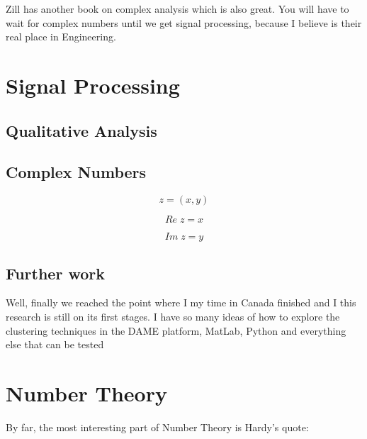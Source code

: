 \documentclass[11pt,fleqn]{book} %
\begin{document}
Zill has another book on complex analysis which is also great.  You will have to wait for complex numbers until we get signal processing, because I believe is their real place in Engineering. 




\chapter{Signal Processing}

\section{Qualitative Analysis}

\section{Complex Numbers}

\begin{equation}
z = (x, y)
\label{eq:c1}
\end{equation}


\begin{equation}
Re \; z = x
\label{eq:c1}
\end{equation}


\begin{equation}
Im \; z = y
\label{eq:c1}
\end{equation}

\section{Further work}
Well, finally we reached the point where I my time in Canada finished and I this research is still on its first stages. I have so many ideas of how to explore the clustering techniques in the DAME platform, MatLab, Python and everything else that can be tested \cite{Linde2012}

\chapter{Number Theory}

By far, the most interesting part of Number Theory is Hardy's quote:
\end{document}
